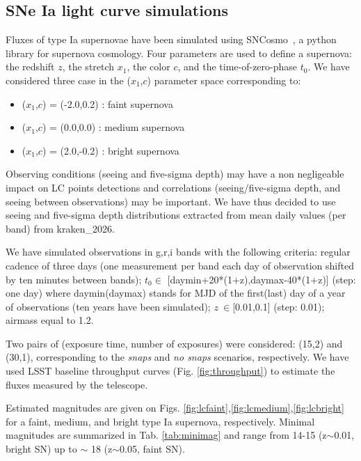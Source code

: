 \documentclass[\docopts]{\docclass}
\newcommand{\sne}{{SNe Ia }}
\newcommand{\sncosmo}{{\sc SNCosmo}}
\newcommand{\redshift}{{$z$}}
\newcommand{\snstretch}{{$x_{1}$}}
\newcommand{\sncolor}{{$c$}}
\newcommand{\daymax}{{$t_{0}$}}
\begin{document}
\subsection{\sne light curve simulations}
Fluxes of type Ia supernovae have been simulated using \sncosmo~\cite{2016ascl.soft11017B}, a python library for supernova cosmology. Four parameters are used to define a supernova: the redshift \redshift, the stretch \snstretch, the color \sncolor, and the time-of-zero-phase \daymax. We have considered three case in the (\snstretch,\sncolor) parameter space corresponding to:
\begin{itemize}
\item (\snstretch,\sncolor) = (-2.0,0.2) : faint supernova
\item (\snstretch,\sncolor) = (0.0,0.0) : medium supernova
 \item (\snstretch,\sncolor) = (2.0,-0.2) : bright supernova
\end{itemize}
Observing conditions (seeing and five-sigma depth) may have a non negligeable impact on LC points detections and correlations (seeing/five-sigma depth, and  seeing between observations) may be important. We have thus decided to use seeing and five-sigma depth distributions extracted from mean daily values (per band) from kraken\_2026.\par
We have simulated observations in g,r,i bands with the following criteria:  regular cadence of three days (one measurement per band each day of observation shifted by ten minutes between bands); \daymax $\in$ [daymin+20*(1+z),daymax-40*(1+z)] (step: one day) where daymin(daymax)  stands for MJD of the first(last)  day of a year of observations (ten years have been simulated); $z~\in$[0.01,0.1] (step: 0.01); airmass equal to 1.2. \par
Two pairs of (exposure time, number of exposures) were considered: (15,2) and (30,1), corresponding to the {\it snaps} and {\it no snaps} scenarios, respectively. We have used LSST baseline throughput curves (Fig. \ref{fig:throughput}) to estimate the fluxes measured by the telescope.


Estimated magnitudes are given on Figs. \ref{fig:lcfaint},\ref{fig:lcmedium},\ref{fig:lcbright} for a faint, medium, and bright type Ia supernova, respectively. Minimal magnitudes are summarized in Tab. \ref{tab:minimag} and range from 14-15 (z$\sim$0.01, bright SN) up to $\sim$ 18 (z$\sim$0.05, faint SN). 
\end{document}

